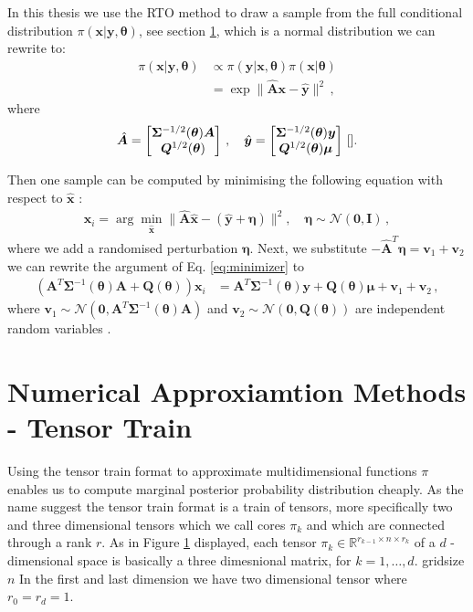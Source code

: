 In this thesis we use the RTO method to draw a sample from the full conditional distribution $\pi( \bm{x}| \bm{y} , \bm{\theta} )$, see section \ref{}, which is a normal distribution we can rewrite to:
\begin{align}
	\pi(\bm{x}|\bm{y}, \bm{\theta} ) &\propto \pi(\bm{y} | \bm{x} , \bm{\theta} ) \pi(\bm{x}| \bm{\theta}) \\
	&= \exp  \lVert \hat{\bm{A}} \bm{x} - \hat{\bm{y}} \rVert^2 \, ,
\end{align}
where 
\begin{align}
	\label{eq:minimizer}
	\hat{\bm{A}} = 
	\begin{bmatrix}
		\bm{\Sigma}^{-1/2}(\bm{\theta})  \bm{A}\\
		\bm{Q}^{1/2}(\bm{\theta}) 
	\end{bmatrix} \, , \quad \hat{\bm{y}} = 
	\begin{bmatrix}
		\bm{\Sigma}^{-1/2}(\bm{\theta})  \bm{y} \\
		\bm{Q}^{1/2}(\bm{\theta}) \bm{\mu}
	\end{bmatrix} \, \text{\cite{}}.
\end{align}

Then one sample can be computed by minimising the following equation with respect to $\hat{\bm{x}}$ :
\begin{align}
	\bm{x}_i = \arg \min_{\hat{\bm{x}}} \lVert \hat{\bm{A}} \hat{\bm{x}} - ( \hat{\bm{y}} + \bm{\eta} ) \rVert^2 , \quad \bm{\eta} \sim \mathcal{N}(\bm{0}, \mathbf{I}) \, ,
\end{align}
where we add a randomised perturbation $\bm{\eta}$.
Next, we substitute $ - \hat{\bm{A}}^T  \bm{\eta}  = \bm{v}_1 + \bm{v}_2$ we can rewrite the argument of Eq. \ref{eq:minimizer} to 
\begin{align}
	\label{eq:RTO}
	(\bm{A}^T \bm{\Sigma}^{-1}(\bm{\theta}) \bm{A}+
	\bm{Q}(\bm{\theta}) ) \bm{x}_i &= \bm{A}^T \bm{\Sigma}^{-1}(\bm{\theta}) \bm{y} +  \bm{Q}(\bm{\theta}) \bm{\mu} + \bm{v}_1 + \bm{v}_2 \,  ,
\end{align}
where $\bm{v}_1 \sim \mathcal{N}(\bm{0}, \bm{A}^T \bm{\Sigma}^{-1}(\bm{\theta}) \bm{A}) $ and $\bm{v}_2 \sim \mathcal{N}(\bm{0}, \bm{Q}(\bm{\theta}) )$ are independent random variables \cite{}.


\section{Numerical Approxiamtion Methods - Tensor Train}
Using the tensor train format to approximate multidimensional functions  $\pi$ enables us to compute marginal posterior probability distribution cheaply.
As the name suggest the tensor train format is a train of tensors, more specifically two and three dimensional tensors which we call cores $\pi_{k}$ and which are connected through a rank $r$.
As in Figure \ref{} displayed, each tensor $\pi_{k} \in \mathbb{R}^{r_{k-1} \times n \times r_{k}}$  of a $d$ - dimensional space is basically a three dimesnional matrix, for $k = 1 ,\dots, d$.
gridsize $n$
In the first and last dimension we have two dimensional tensor where $r_0  = r_d = 1$.




